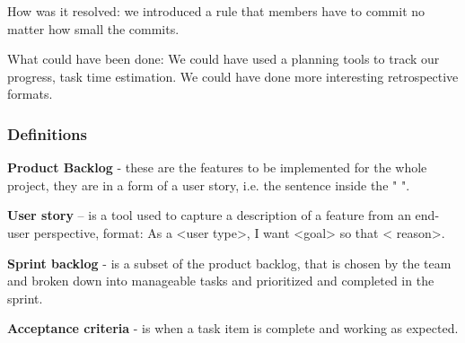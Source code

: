 \documentclass[10pt]{article}
\begin{document}
How was it resolved: we introduced a rule that members have to commit no matter how small the commits.

What could have been done: We could have used a planning tools to track our progress, task time estimation. We could have done more interesting retrospective formats.

\subsubsection{Definitions}

\textbf{Product Backlog} - these are the features to be implemented for the whole project, they are in a form of a user story, i.e. the sentence inside the " ".

\textbf{User story} – is a tool used to capture a description of a feature from an end-user perspective, format: As a <user type>, I want <goal> so that < reason>.

\textbf{Sprint backlog} - is a subset of the product backlog, that is chosen by the team and broken down into manageable tasks and prioritized and completed in the sprint.

\textbf{Acceptance criteria} - is when a task item is complete and working as expected.
\end{document}
